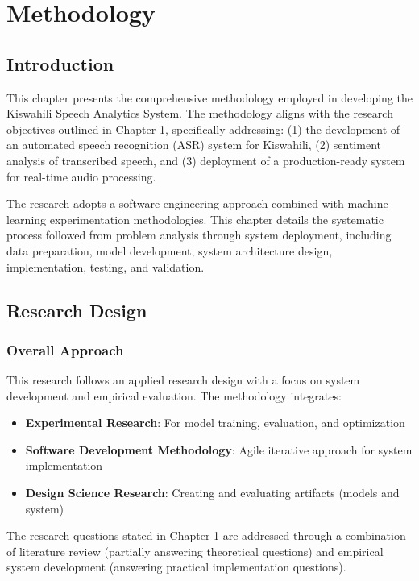 \documentclass[12pt,a4paper]{report}
\begin{document}
\chapter{Methodology}

\section{Introduction}
This chapter presents the comprehensive methodology employed in developing the Kiswahili Speech Analytics System. The methodology aligns with the research objectives outlined in Chapter 1, specifically addressing: (1) the development of an automated speech recognition (ASR) system for Kiswahili, (2) sentiment analysis of transcribed speech, and (3) deployment of a production-ready system for real-time audio processing.

The research adopts a software engineering approach combined with machine learning experimentation methodologies. This chapter details the systematic process followed from problem analysis through system deployment, including data preparation, model development, system architecture design, implementation, testing, and validation.

\section{Research Design}
\subsection{Overall Approach}
This research follows an applied research design with a focus on system development and empirical evaluation. The methodology integrates:

\begin{itemize}
    \item \textbf{Experimental Research}: For model training, evaluation, and optimization
    \item \textbf{Software Development Methodology}: Agile iterative approach for system implementation
    \item \textbf{Design Science Research}: Creating and evaluating artifacts (models and system)
\end{itemize}

The research questions stated in Chapter 1 are addressed through a combination of literature review (partially answering theoretical questions) and empirical system development (answering practical implementation questions).
\end{document}
